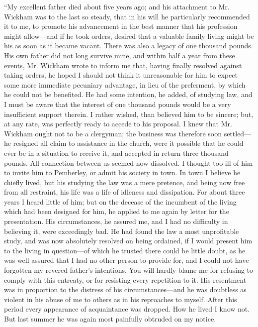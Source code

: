 “My excellent father died about five years ago; and his attachment to Mr. Wickham was to the last so steady, that in his will he particularly recommended it to me, to promote his advancement in the best manner that his profession might allow---and if he took orders, desired that a valuable family living might be his as soon as it became vacant. There was also a legacy of one thousand pounds. His own father did not long survive mine, and within half a year from these events, Mr. Wickham wrote to inform me that, having finally resolved against taking orders, he hoped I should not think it unreasonable for him to expect some more immediate pecuniary advantage, in lieu of the preferment, by which he could not be benefited. He had some intention, he added, of studying law, and I must be aware that the interest of one thousand pounds would be a very insufficient support therein. I rather wished, than believed him to be sincere; but, at any rate, was perfectly ready to accede to his proposal. I knew that Mr. Wickham ought not to be a clergyman; the business was therefore soon settled---he resigned all claim to assistance in the church, were it possible that he could ever be in a situation to receive it, and accepted in return three thousand pounds. All connection between us seemed now dissolved. I thought too ill of him to invite him to Pemberley, or admit his society in town. In town I believe he chiefly lived, but his studying the law was a mere pretence, and being now free from all restraint, his life was a life of idleness and dissipation. For about three years I heard little of him; but on the decease of the incumbent of the living which had been designed for him, he applied to me again by letter for the presentation. His circumstances, he assured me, and I had no difficulty in believing it, were exceedingly bad. He had found the law a most unprofitable study, and was now absolutely resolved on being ordained, if I would present him to the living in question---of which he trusted there could be little doubt, as he was well assured that I had no other person to provide for, and I could not have forgotten my revered father's intentions. You will hardly blame me for refusing to comply with this entreaty, or for resisting every repetition to it. His resentment was in proportion to the distress of his circumstances---and he was doubtless as violent in his abuse of me to others as in his reproaches to myself. After this period every appearance of acquaintance was dropped. How he lived I know not. But last summer he was again most painfully obtruded on my notice.

